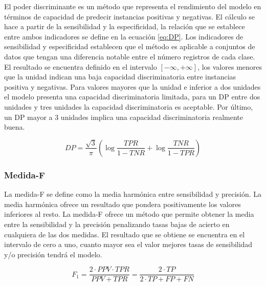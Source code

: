 El poder discriminante \cite{DP2006} es un método que representa el rendimiento del modelo en términos de capacidad de predecir instancias positivas y negativas. El cálculo se hace a partir de la sensibilidad y la especificidad, la relación que se establece entre ambos indicadores se define en la ecuación \ref{eq:DP}. Los indicadores de sensibilidad y especificidad establecen que el método es aplicable a conjuntos de datos que tengan una diferencia notable entre el número registros de cada clase. El resultado se encuentra definido en el intervalo $[-\infty, +\infty]$, los valores menores que la unidad indican una baja capacidad discriminatoria entre instancias positiva y negativas. Para valores mayores que la unidad e inferior a dos unidades el modelo presenta una capacidad discriminatoria limitada, para un DP entre dos unidades y tres unidades la capacidad discriminatoria es aceptable. Por último, un DP mayor a 3 unidades implica una capacidad discriminatoria realmente buena.

\bigbreak

\begin{equation}
    DP = \frac{\sqrt{3}}{\pi}(\log{\frac{TPR}{1-TNR}}+\log{\frac{TNR}{1-TPR}})
    \label{eq:DP}
\end{equation}


\subsubsection{Medida-F}

La medida-F \cite{fscore2017} se define como la media harmónica entre sensibilidad y precisión. La media harmónica ofrece un resultado que pondera positivamente los valores inferiores al resto. La medida-F ofrece un método que permite obtener la media entre la sensibilidad y la precisión penalizando tasas bajas de acierto en cualquiera de las dos medidas. El resultado que se obtiene se encuentra en el intervalo de cero a uno, cuanto mayor sea el valor mejores tasas de sensibilidad y/o precisión tendrá el modelo.

\bigbreak

\begin{equation}
    F_{1} = \frac{2 \cdot PPV \cdot TPR}{PPV+TPR} = \frac{2 \cdot TP}{2 \cdot TP + FP + FN}
    \label{eq:FSCORE}
\end{equation}


